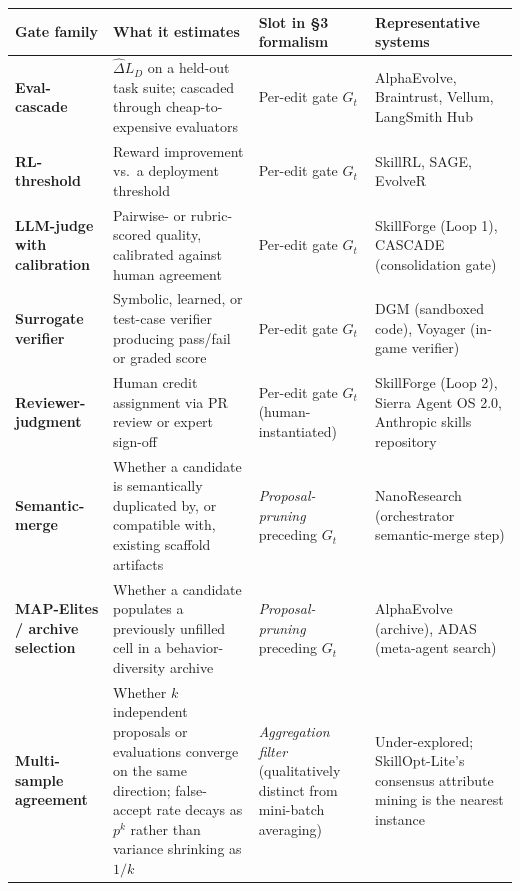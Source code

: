 \documentclass[
]{article}
\newcounter{none} %
\begin{document}
{\def\LTcaptype{none} %
\begin{longtable}[]{@{}
  >{\raggedright\arraybackslash}p{}
  >{\raggedright\arraybackslash}p{}
  >{\raggedright\arraybackslash}p{}
  >{\raggedright\arraybackslash}p{}@{}}
\toprule\noalign{}
\begin{minipage}[b]{\linewidth}\raggedright
Gate family
\end{minipage} & \begin{minipage}[b]{\linewidth}\raggedright
What it estimates
\end{minipage} & \begin{minipage}[b]{\linewidth}\raggedright
Slot in §3 formalism
\end{minipage} & \begin{minipage}[b]{\linewidth}\raggedright
Representative systems
\end{minipage} \\
\midrule\noalign{}
\endhead
\bottomrule\noalign{}
\endlastfoot
\textbf{Eval-cascade} & \(\widehat{\Delta} L_D\) on a held-out task
suite; cascaded through cheap-to-expensive evaluators & Per-edit gate
\(G_t\) & AlphaEvolve, Braintrust, Vellum, LangSmith Hub \\
\textbf{RL-threshold} & Reward improvement vs.~a deployment threshold &
Per-edit gate \(G_t\) & SkillRL, SAGE, EvolveR \\
\textbf{LLM-judge with calibration} & Pairwise- or rubric-scored
quality, calibrated against human agreement & Per-edit gate \(G_t\) &
SkillForge (Loop 1), CASCADE (consolidation gate) \\
\textbf{Surrogate verifier} & Symbolic, learned, or test-case verifier
producing pass/fail or graded score & Per-edit gate \(G_t\) & DGM
(sandboxed code), Voyager (in-game verifier) \\
\textbf{Reviewer-judgment} & Human credit assignment via PR review or
expert sign-off & Per-edit gate \(G_t\) (human-instantiated) &
SkillForge (Loop 2), Sierra Agent OS 2.0, Anthropic skills repository \\
\textbf{Semantic-merge} & Whether a candidate is semantically duplicated
by, or compatible with, existing scaffold artifacts &
\emph{Proposal-pruning} preceding \(G_t\) & NanoResearch (orchestrator
semantic-merge step) \\
\textbf{MAP-Elites / archive selection} & Whether a candidate populates
a previously unfilled cell in a behavior-diversity archive &
\emph{Proposal-pruning} preceding \(G_t\) & AlphaEvolve (archive), ADAS
(meta-agent search) \\
\textbf{Multi-sample agreement} & Whether \(k\) independent proposals or
evaluations converge on the same direction; false-accept rate decays as
\(p^k\) rather than variance shrinking as \(1/k\) & \emph{Aggregation
filter} (qualitatively distinct from mini-batch averaging) &
Under-explored; SkillOpt-Lite's consensus attribute mining is the
nearest instance \\
\end{longtable}
}
\end{document}
